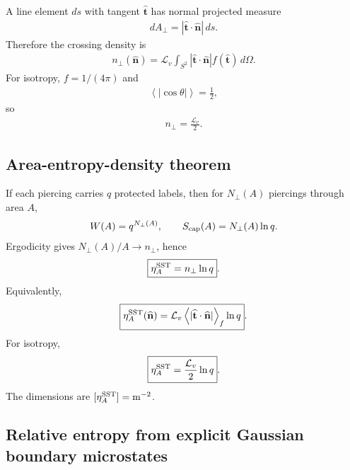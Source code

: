A line element $ds$ with tangent $\widehat{\mathbf t}$ has normal projected
measure
\begin{align}
    dA_\perp
    =
    |\widehat{\mathbf t}\cdot\widehat{\mathbf n}|\,ds.
\end{align}
Therefore the crossing density is
\begin{align}
    \boxed{
    n_\perp(\widehat{\mathbf n})
    =
    \mathcal L_v
    \int_{S^2}
    |\widehat{\mathbf t}\cdot\widehat{\mathbf n}|
    f(\widehat{\mathbf t})\,d\Omega
    }.
    \label{eq:rt_v004_nperp_general}
\end{align}
For isotropy, $f=1/(4\pi)$ and
\begin{align}
    \left\langle|\cos\theta|\right\rangle
    =\frac12,
\end{align}
so
\begin{align}
    \boxed{
    n_\perp=\frac{\mathcal L_v}{2}
    }.
    \label{eq:rt_v004_nperp_isotropic}
\end{align}

\subsection{Area-entropy-density theorem}

If each piercing carries $q$ protected labels, then for $N_\perp(A)$
piercings through area $A$,
\begin{align}
    W(A)=q^{N_\perp(A)},
    \qquad
    S_{\rm cap}(A)=N_\perp(A)\ln q.
\end{align}
Ergodicity gives $N_\perp(A)/A\to n_\perp$, hence
\begin{align}
    \boxed{
    \eta_A^{\rm SST}
    =
    n_\perp\ln q
    }.
    \label{eq:rt_v004_eta_general}
\end{align}
Equivalently,
\begin{align}
    \boxed{
    \eta_A^{\rm SST}(\widehat{\mathbf n})
    =
    \mathcal L_v
    \left\langle
    |\widehat{\mathbf t}\cdot\widehat{\mathbf n}|
    \right\rangle_f
    \ln q
    }.
\end{align}
For isotropy,
\begin{align}
    \boxed{
    \eta_A^{\rm SST}
    =
    \frac{\mathcal L_v}{2}\ln q
    }.
    \label{eq:rt_v004_eta_isotropic}
\end{align}
The dimensions are $[\eta_A^{\rm SST}]=\mathrm{m^{-2}}$.

\subsection{Relative entropy from explicit Gaussian boundary microstates}

